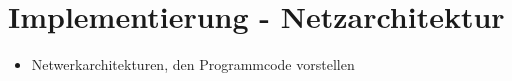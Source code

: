 \section{Implementierung - Netzarchitektur}
\begin{itemize}
\item Netwerkarchitekturen, den Programmcode vorstellen
\end{itemize}